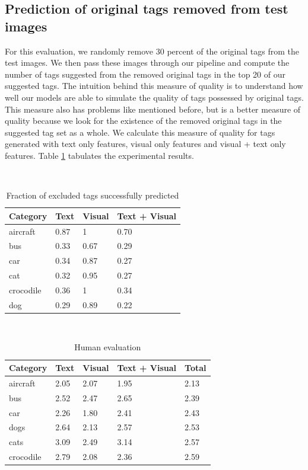 \documentclass[12pt]{article}
\begin{document}
\subsection{Prediction of original tags removed from test images}
For this evaluation, we randomly remove 30 percent of the original tags from the test images. We
then pass these images through our pipeline and compute the number of tags suggested from the
removed original tags in the top 20 of our suggested tags. The intuition behind this measure of
quality is to understand how well our models are able to simulate the quality of tags possessed
by original tags. This measure also has problems like mentioned before, but is a better measure
of quality because we look for the existence of the removed original tags in the suggested tag
set as a whole. We calculate this measure of quality for tags generated with text only features,
visual only features and visual + text only features. Table \ref{tab:frac} tabulates the experimental results.

\begin{table}
  \label{tab:frac}
   \caption{Fraction of excluded tags successfully predicted}
\begin{center}
    \begin{tabular}{|l l l l|}
\hline
Category & Text & Visual & Text + Visual \\
\hline
aircraft & 0.87 & 1 & 0.70 \\
bus  & 0.33 & 0.67 & 0.29 \\
car &  0.34 & 0.87 & 0.27 \\
cat &  0.32 & 0.95 & 0.27 \\
crocodile &  0.36 & 1 & 0.34 \\
dog  & 0.29 & 0.89 & 0.22 \\
\hline
\end{tabular}
\end{center}
\end{table}

\begin{table}
  \label{tab:human}
  \caption{Human evaluation}
\begin{center}
    \begin{tabular}{|l l l l l|}
\hline
Category & Text & Visual & Text + Visual & Total \\
\hline
aircraft & 2.05 & 2.07 & 1.95 & 2.13 \\
bus & 2.52 & 2.47 & 2.65 & 2.39 \\
car & 2.26 & 1.80 & 2.41 & 2.43 \\
dogs & 2.64 & 2.13 & 2.57 & 2.53 \\
cats & 3.09 & 2.49 & 3.14 & 2.57 \\
crocodile & 2.79 & 2.08 & 2.36 & 2.59 \\
\hline
\end{tabular}
\end{center}
\end{table}
\end{document}
